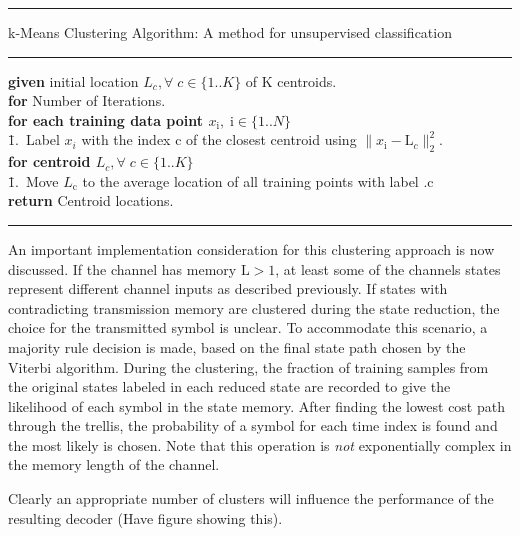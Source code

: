 \documentclass[12pt,a4paper]{report}
\begin{document}
    \noindent\rule[16pt]{\textwidth}{0.6pt}
k-Means Clustering Algorithm: A method for unsupervised classification

    \noindent\rule[10pt]{\textwidth}{0.4pt}
    {\footnotesize
    \begin{tabbing}
    {\bf given} initial location $L_c, \forall \;c  \in \{1..K\}$ of K centroids.\\
        {\textbf{for} Number of Iterations}.\\
         \qquad \= {\bf for each training data point $x_{\mathrm{i}}, \;\mathrm{i}  \in \{1..N\}$}\\
        \qquad \qquad \= 1.\ Label $x_i$ with the index c of the closest centroid using $\|x_{\mathrm{i}}- \text{L}_c\|^2_2$. \\
        \qquad \= {\bf for centroid $L_c, \forall \;c  \in \{1..K\}$}\\
                \qquad \qquad \= 1.\ Move $L_{\mathrm{c}}$ to the average location of all training points with label .c\\


        {\bf return} Centroid locations.
    \end{tabbing}}
    \noindent\rule[10pt]{\textwidth}{0.4pt}
    

\par
An important implementation consideration for this clustering approach is now discussed. If the channel has memory $\text{L}>1$, at least some of the channels states represent different channel inputs as described previously. If states with contradicting transmission memory are clustered during the state reduction, the choice for the transmitted symbol is unclear. To accommodate this scenario, a majority rule decision is made, based on the final state path chosen by the Viterbi algorithm. During the clustering, the fraction of training samples from the original states labeled in each reduced state are recorded to give the likelihood of each symbol in the state memory. After finding the lowest cost path through the trellis, the probability of a symbol for each time index is found and the most likely is chosen. Note that this operation is \emph{not} exponentially complex in the memory length of the channel.

\par 
Clearly an appropriate number of clusters will influence the performance of the resulting decoder (Have figure showing this).
\end{document}

